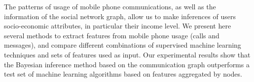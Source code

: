 The patterns of usage of mobile phone communications, as well as the information of the social network graph, allow us to make inferences of users socio-economic attributes, in particular their income level.
We present here several methods to extract features from mobile phone usage (calls and messages), and compare different combinations of supervised machine learning techniques and sets of features used as input.
Our experimental results show that the Bayesian inference method based on the communication graph outperforms a test set of machine learning algorithms based on features aggregated by nodes.

